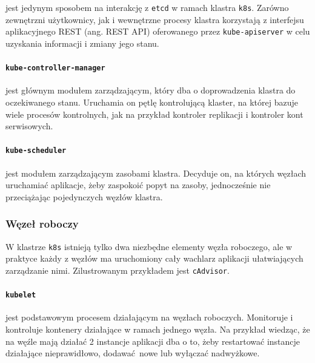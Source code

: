\documentclass[a4paper,12pt,twoside,openany]{report}
\newcommand{\passthrough}[1]{#1}
\begin{document}
jest jedynym sposobem na interakcję z \passthrough{\lstinline!etcd!} w
ramach klastra \passthrough{\lstinline!k8s!}. Zarówno zewnętrzni
użytkownicy, jak i wewnętrzne procesy klastra korzystają z interfejsu
aplikacyjnego REST (ang. REST API) oferowanego przez
\passthrough{\lstinline!kube-apiserver!} w celu uzyskania informacji i
zmiany jego stanu.

\hypertarget{kube-controller-manager}{%
\paragraph{\texorpdfstring{\texttt{kube-controller-manager}}{kube-controller-manager}}\label{kube-controller-manager}}

jest głównym modułem zarządzającym, który dba o doprowadzenia klastra do
oczekiwanego stanu. Uruchamia on pętlę kontrolującą klaster, na której
bazuje wiele procesów kontrolnych, jak na przykład kontroler replikacji
i kontroler kont serwisowych.

\hypertarget{kube-scheduler}{%
\paragraph{\texorpdfstring{\texttt{kube-scheduler}}{kube-scheduler}}\label{kube-scheduler}}

jest modułem zarządzającym zasobami klastra. Decyduje on, na których
węzłach uruchamiać aplikacje, żeby zaspokoić popyt na zasoby,
jednocześnie nie przeciążając pojedynczych węzłów klastra.

\hypertarget{wux119zeux142-roboczy}{%
\subsubsection{Węzeł roboczy}\label{wux119zeux142-roboczy}}

W klastrze \passthrough{\lstinline!k8s!} istnieją tylko dwa niezbędne
elementy węzła roboczego, ale w praktyce każdy z węzłów ma uruchomiony
cały wachlarz aplikacji ułatwiających zarządzanie nimi. Zilustrowanym
przykładem jest \passthrough{\lstinline!cAdvisor!}.

\hypertarget{kubelet}{%
\paragraph{\texorpdfstring{\texttt{kubelet}}{kubelet}}\label{kubelet}}

jest podstawowym procesem działającym na węzłach roboczych. Monitoruje i
kontroluje kontenery działające w ramach jednego węzła. Na przykład
wiedząc, że na węźle mają działać 2 instancje aplikacji dba o to, żeby
restartować instancje działające nieprawidłowo, dodawać~nowe lub
wyłączać nadwyżkowe.
\end{document}
